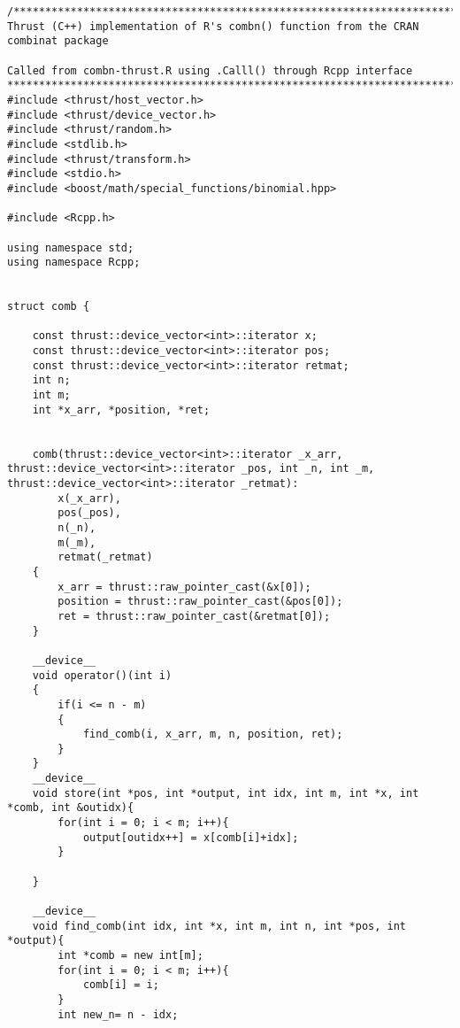 {



\begin{lstlisting}
/*********************************************************************************
Thrust (C++) implementation of R's combn() function from the CRAN combinat package

Called from combn-thrust.R using .Calll() through Rcpp interface
**********************************************************************************/
#include <thrust/host_vector.h>
#include <thrust/device_vector.h>
#include <thrust/random.h>
#include <stdlib.h>
#include <thrust/transform.h>
#include <stdio.h>
#include <boost/math/special_functions/binomial.hpp>

#include <Rcpp.h>

using namespace std; 
using namespace Rcpp;


struct comb {
	
	const thrust::device_vector<int>::iterator x;
	const thrust::device_vector<int>::iterator pos;
	const thrust::device_vector<int>::iterator retmat;
	int n;
	int m;
	int *x_arr, *position, *ret;


	comb(thrust::device_vector<int>::iterator _x_arr, thrust::device_vector<int>::iterator _pos, int _n, int _m, thrust::device_vector<int>::iterator _retmat):
		x(_x_arr),
		pos(_pos),
		n(_n),
		m(_m),
		retmat(_retmat)
	{
		x_arr = thrust::raw_pointer_cast(&x[0]);		
		position = thrust::raw_pointer_cast(&pos[0]);
		ret = thrust::raw_pointer_cast(&retmat[0]);
	}
	
	__device__
	void operator()(int i)
	{
        if(i <= n - m)
        {
            find_comb(i, x_arr, m, n, position, ret);
        }
	}
	__device__
	void store(int *pos, int *output, int idx, int m, int *x, int *comb, int &outidx){
		for(int i = 0; i < m; i++){
			output[outidx++] = x[comb[i]+idx];
		}

	}

	__device__
	void find_comb(int idx, int *x, int m, int n, int *pos, int *output){
		int *comb = new int[m];
		for(int i = 0; i < m; i++){
			comb[i] = i;
		}
		int new_n= n - idx;
        

\end{lstlisting}}
